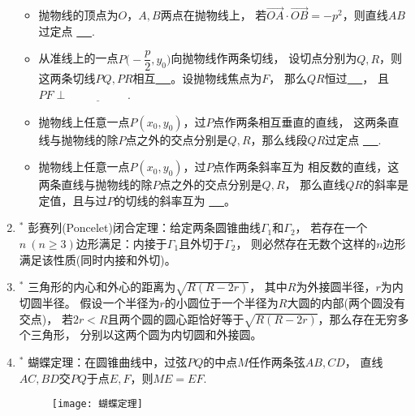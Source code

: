 \documentclass{article}
\newif\ifte
\renewcommand{\vec}{\overrightarrow}
\renewcommand\geq\geqslant
\begin{document}
\begin{multicols}{2}
\begin{enumerate}[leftmargin=20pt]
\begin{itemize}[leftmargin=-4pt]
\item 抛物线的顶点为$ O $，$ A,B $两点在抛物线上，
若$ \vec{OA}\cdot\vec{OB}=-p^2 $，则直线$ AB $过定点
\underline{\ \ifte $ (p,0) $\else \hspace{2cm} \fi\ }.

\item 从准线上的一点$ P\Big(-\dfrac{p}{2},y_0\Big) $向抛物线作两条切线，
设切点分别为$ Q,R $，则这两条切线$ PQ,PR $相互\underline{\ 
    \ifte 垂直\else \hspace{2cm} \fi\ }。设抛物线焦点为$ F $，
那么$ QR $恒过\underline{\ \ifte 焦点 \else \hspace{2cm} \fi\ }，
且$ PF\perp \underline{\ \ifte QR\else \hspace{2cm} \fi\ } $.

\item 抛物线上任意一点$ P(x_0,y_0) $，过$ P $点作两条相互垂直的直线，
这两条直线与抛物线的除$ P $点之外的交点分别是$ Q,R $，那么线段$ QR $过定点
\underline{\ \ifte $ (x_0+2p,-y_0) $\else \hspace{2cm} \fi\ }.

\item 抛物线上任意一点$ P(x_0,y_0) $，过$ P $点作两条斜率互为
相反数的直线，这两条直线与抛物线的除$ P $点之外的交点分别是$ Q,R $，
那么直线$ QR $的斜率是定值，且与过$ P $的切线的斜率互为
\underline{\ \ifte 相反数\else \hspace{2cm} \fi\ }。


\end{itemize}

\item $^*$ 彭赛列(Poncelet)闭合定理：给定两条圆锥曲线$ \Gamma_1 $和$ \Gamma_2 $，
若存在一个$ n\ (n\geq 3) $边形满足：内接于$ \Gamma_1 $且外切于$ \Gamma_2 $，
则必然存在无数个这样的$ n $边形满足该性质(同时内接和外切)。

\item $^*$ 三角形的内心和外心的距离为$ \sqrt{R(R-2r)} $，
其中$ R $为外接圆半径，$ r $为内切圆半径。
假设一个半径为$ r $的小圆位于一个半径为$ R $大圆的内部(两个圆没有交点)，
若$ 2r<R $且两个圆的圆心距恰好等于$ \sqrt{R(R-2r)} $，那么存在无穷多个三角形，
分别以这两个圆为内切圆和外接圆。

\item $^*$ 蝴蝶定理：在圆锥曲线中，过弦$ PQ $的中点$ M $任作两条弦$ AB,CD $，
直线$ AC,BD $交$ PQ $于点$ E,F $，则$ ME=EF $.
\begin{figure}[H]
    \centering
    \texttt{[image: 蝴蝶定理]}
\end{figure}



\end{enumerate}
\end{multicols}
\end{document}
